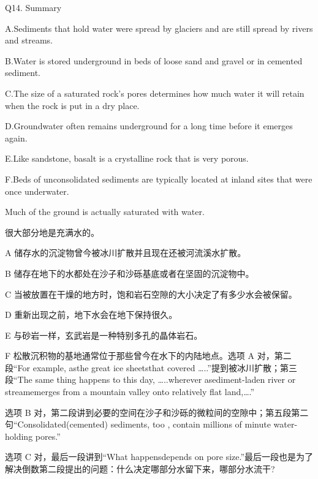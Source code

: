 \begin{blk}
    \begin{qst}
        Q14. Summary
    \end{qst}

    \begin{chc}
        A.Sediments that hold water were spread by glaciers and are still spread by rivers and streams.

        B.Water is stored underground in beds of loose sand and gravel or in cemented sediment.

        C.The size of a saturated rock’s pores determines how much water it will retain when the rock is put in a dry place.

        D.Groundwater often remains underground for a long time before it emerges again.

        E.Like sandstone, basalt is a crystalline rock that is very porous.

        F.Beds of unconsolidated sediments are typically located at inland sites that were once underwater.
    \end{chc}

    \begin{nlz}
        Much of the ground is actually saturated with water.

        很大部分地是充满水的。

        A 储存水的沉淀物曾今被冰川扩散并且现在还被河流溪水扩散。

        B 储存在地下的水都处在沙子和沙砾基底或者在坚固的沉淀物中。

        C 当被放置在干燥的地方时，饱和岩石空隙的大小决定了有多少水会被保留。

        D 重新出现之前，地下水会在地下保持很久。

        E 与砂岩一样，玄武岩是一种特别多孔的晶体岩石。

        F 松散沉积物的基地通常位于那些曾今在水下的内陆地点。选项 A 对，第二段“For example, asthe great ice sheetsthat covered …..”提到被冰川扩散；第三段“The same thing happens to this day, …..wherever asediment-laden river or streamemerges from a mountain valley onto relatively flat land,….”

        选项 B 对，第二段讲到必要的空间在沙子和沙砾的微粒间的空隙中；第五段第二句“Consolidated(cemented) sediments, too , contain millions of minute water-holding pores.”

        选项 C 对，最后一段讲到“What happensdepends on pore size.”最后一段也是为了解决倒数第二段提出的问题：什么决定哪部分水留下来，哪部分水流干?


\end{nlz}
\end{blk}
